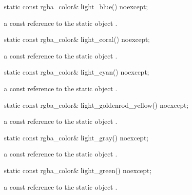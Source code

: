\begin{itemdecl}
static const rgba_color& light_blue() noexcept;
\end{itemdecl}
\begin{itemdescr}
\pnum
\returns
a const reference to the static  object .
\end{itemdescr}

\begin{itemdecl}
static const rgba_color& light_coral() noexcept;
\end{itemdecl}
\begin{itemdescr}
\pnum
\returns
a const reference to the static  object .
\end{itemdescr}

\begin{itemdecl}
static const rgba_color& light_cyan() noexcept;
\end{itemdecl}
\begin{itemdescr}
\pnum
\returns
a const reference to the static  object .
\end{itemdescr}

\begin{itemdecl}
static const rgba_color& light_goldenrod_yellow() noexcept;
\end{itemdecl}
\begin{itemdescr}
\pnum
\returns
a const reference to the static  object .
\end{itemdescr}

\begin{itemdecl}
static const rgba_color& light_gray() noexcept;
\end{itemdecl}
\begin{itemdescr}
\pnum
\returns
a const reference to the static  object .
\end{itemdescr}

\begin{itemdecl}
static const rgba_color& light_green() noexcept;
\end{itemdecl}
\begin{itemdescr}
\pnum
\returns
a const reference to the static  object .
\end{itemdescr}

